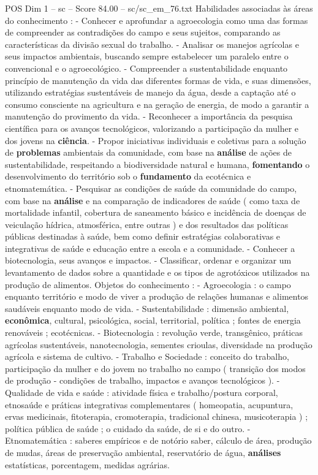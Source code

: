 \begin{textsample}{POS Dim 1 – sc – Score 84.00 – sc/sc\_em\_76.txt}
Habilidades associadas às áreas do conhecimento : - Conhecer e aprofundar a agroecologia como uma das formas de compreender as contradições do campo e seus sujeitos, comparando as características da divisão sexual do trabalho. - Analisar os manejos agrícolas e seus impactos ambientais, buscando sempre estabelecer um paralelo entre o convencional e o agroecológico. - Compreender a sustentabilidade enquanto princípio de manutenção da vida das diferentes formas de vida, e suas dimensões, utilizando estratégias sustentáveis de manejo da água, desde a captação até o consumo consciente na agricultura e na geração de energia, de modo a garantir a manutenção do provimento da vida. - Reconhecer a importância da pesquisa científica para os avanços tecnológicos, valorizando a participação da mulher e dos jovens na \textbf{ciência}. - Propor iniciativas individuais e coletivas para a solução de \textbf{problemas} ambientais da comunidade, com base na \textbf{análise} de ações de sustentabilidade, respeitando a biodiversidade natural e humana, \textbf{fomentando} o desenvolvimento do território sob o \textbf{fundamento} da ecotécnica e etnomatemática. - Pesquisar as condições de saúde da comunidade do campo, com base na \textbf{análise} e na comparação de indicadores de saúde ( como taxa de mortalidade infantil, cobertura de saneamento básico e incidência de doenças de veiculação hídrica, atmosférica, entre outras ) e dos resultados das políticas públicas destinadas à saúde, bem como definir estratégias colaborativas e integrativas de saúde e educação entre a escola e a comunidade. - Conhecer a biotecnologia, seus avanços e impactos. - Classificar, ordenar e organizar um levantamento de dados sobre a quantidade e os tipos de agrotóxicos utilizados na produção de alimentos.
Objetos do conhecimento : - Agroecologia : o campo enquanto território e modo de viver a produção de relações humanas e alimentos saudáveis enquanto modo de vida. - Sustentabilidade : dimensão ambiental, \textbf{econômica}, cultural, psicológica, social, territorial, política ; fontes de energia renováveis ; ecotécnicas. - Biotecnologia : revolução verde, transgênico, práticas agrícolas sustentáveis, nanotecnologia, sementes crioulas, diversidade na produção agrícola e sistema de cultivo. - Trabalho e Sociedade : conceito do trabalho, participação da mulher e do jovem no trabalho no campo ( transição dos modos de produção - condições de trabalho, impactos e avanços tecnológicos ). - Qualidade de vida e saúde : atividade física e trabalho/postura corporal, etnosaúde e práticas integrativas complementares ( homeopatia, acupuntura, ervas medicinais, fitoterapia, cromoterapia, tradicional chinesa, musicoterapia ) ; política pública de saúde ; o cuidado da saúde, de si e do outro. - Etnomatemática : saberes empíricos e de notório saber, cálculo de área, produção de mudas, áreas de preservação ambiental, reservatório de água, \textbf{análises} estatísticas, porcentagem, medidas agrárias.

\end{textsample}
